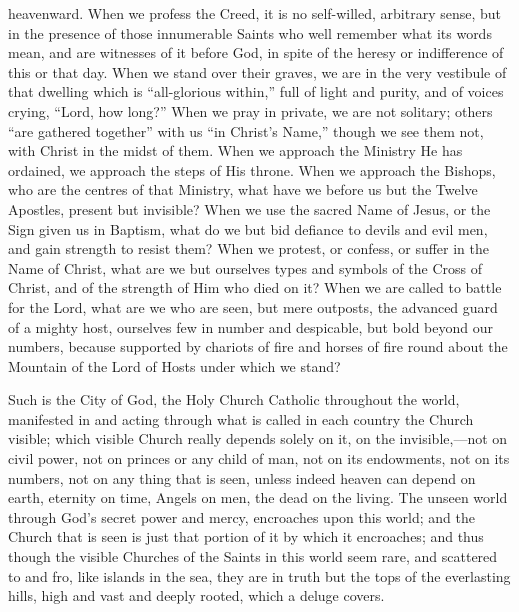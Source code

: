 heavenward. When we profess the Creed, it is no self-willed, arbitrary
sense, but in the presence of those innumerable Saints who well
remember what its words mean, and are witnesses of it before God, in
spite of the heresy or indifference of this or that day. When we stand
over their graves, we are in the very vestibule of that dwelling which
is ``all-glorious within,'' full of light and purity, and of
voices crying, ``Lord, how long?'' When we pray in private, we
are not solitary; others ``are gathered together'' with us
``in Christ's Name,'' though we see them not, with Christ in
the midst of them. When we approach the Ministry He has ordained, we
approach the steps of His throne. When we approach the Bishops, who
are the centres of that Ministry, what have we before us but the
Twelve Apostles, present but invisible? When we use the sacred Name of
Jesus, or the Sign given us in Baptism, what do we but bid defiance to
devils and evil men, and gain strength to resist them? When we
protest, or confess, or suffer in the Name of Christ, what are we but
ourselves types and symbols of the Cross of Christ, and of the
strength of Him who died on it? When we are called to battle for the
Lord, what are we who are seen, but mere outposts, the advanced guard
of a mighty host, ourselves few in number and despicable, but bold
beyond our numbers, because supported by chariots of fire and horses
of fire round about the Mountain of the Lord of Hosts under which we
stand?

Such is the City of God, the Holy Church Catholic throughout the
world, manifested in and acting through what is called in each country
the Church visible; which visible Church really depends solely on it,
on the invisible,—not on civil power, not on princes or any child of
man, not on its endowments, not on its numbers, not on any thing that
is seen, unless indeed heaven can depend on earth, eternity on time,
Angels on men, the dead on the living. The unseen world through God's
secret power and mercy, encroaches upon this world; and the Church
that is seen is just that portion of it by which it encroaches; and
thus though the visible Churches of the Saints in this world seem
rare, and scattered to and fro, like islands in the sea, they are in
truth but the tops of the everlasting hills, high and vast and deeply
rooted, which a deluge covers.

